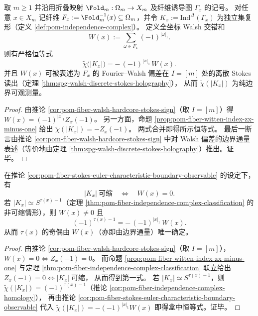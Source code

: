 \begin{corollary}\label{cor:pom-fiber-stokes-euler-characteristic-boundary-observable}
取 \(m\ge 1\) 并沿用折叠映射 \(\Fold_m:\Omega_m\to X_m\) 及纤维诱导图 \(\Gamma_x\) 的记号。
对任意 \(x\in X_m\) 记纤维 \(F_x:=\Fold_m^{-1}(x)\subseteq\Omega_m\)，并令
\(
K_x:=\mathrm{Ind}^{\Delta}(\Gamma_x)
\)
为独立集复形（定义 \ref{def:pom-independence-complex}）。
定义全坐标 Walsh 交错和
\[
W(x):=\sum_{\omega\in F_x}(-1)^{|\omega|_1}.
\]
则有严格恒等式
\[
\boxed{\;\widetilde\chi\bigl(|K_x|\bigr)= -\,(-1)^{|x|_1}\,W(x).\;}
\]
并且 \(W(x)\) 可被表述为 \(F_x\) 的 Fourier--Walsh 偏差在 \(I=[m]\) 处的离散 Stokes 读出（定理 \ref{thm:spg-walsh-discrete-stokes-holography}），
从而 \(\widetilde\chi(|K_x|)\) 为纯边界可观测量。
\end{corollary}
\begin{proof}
由推论 \ref{cor:pom-fiber-walsh-hardcore-stokes-sign}（取 \(I=[m]\)）得
\(
W(x)=(-1)^{|x|_1}Z_x(-1)
\)。
另一方面，命题 \ref{prop:pom-fiber-witten-index-zx-minus-one} 给出
\(
\widetilde\chi(|K_x|)=-Z_x(-1)
\)。
两式合并即得所示恒等式。
最后一断言由推论 \ref{cor:pom-fiber-walsh-hardcore-stokes-sign} 中对 Walsh 偏差的边界通量表述（等价地由定理 \ref{thm:spg-walsh-discrete-stokes-holography}）推出。证毕。
\end{proof}

\begin{corollary}[可缩性判别与球面奇偶的边界读出]\label{cor:pom-fiber-contractibility-sphere-parity-by-walsh}
在推论 \ref{cor:pom-fiber-stokes-euler-characteristic-boundary-observable} 的设定下，有
\[
|K_x|\ \text{可缩}\quad\Longleftrightarrow\quad W(x)=0.
\]
若 \(|K_x|\simeq S^{\tau(x)-1}\)（定理 \ref{thm:pom-fiber-independence-complex-classification} 的非可缩情形），则 \(W(x)\neq 0\) 且
\[
\boxed{\;
(-1)^{\tau(x)-1}= -\,(-1)^{|x|_1}\,W(x).\;}
\]
从而 \(\tau(x)\) 的奇偶由 \(W(x)\)（亦即由边界通量）唯一确定。
\end{corollary}
\begin{proof}
由推论 \ref{cor:pom-fiber-walsh-hardcore-stokes-sign}（取 \(I=[m]\)），\(W(x)=0\iff Z_x(-1)=0\)。
而命题 \ref{prop:pom-fiber-witten-index-zx-minus-one} 与定理 \ref{thm:pom-fiber-independence-complex-classification} 联立给出
\(
Z_x(-1)=0\iff |K_x|\ \text{可缩}
\)，
从而得到第一式。
若 \(|K_x|\simeq S^{\tau(x)-1}\)，则 \(\widetilde\chi(|K_x|)=(-1)^{\tau(x)-1}\)（推论 \ref{cor:pom-fiber-independence-complex-homology}），
再由推论 \ref{cor:pom-fiber-stokes-euler-characteristic-boundary-observable} 代入 \(\widetilde\chi(|K_x|)=-(-1)^{|x|_1}W(x)\) 即得盒中恒等式。证毕。
\end{proof}

